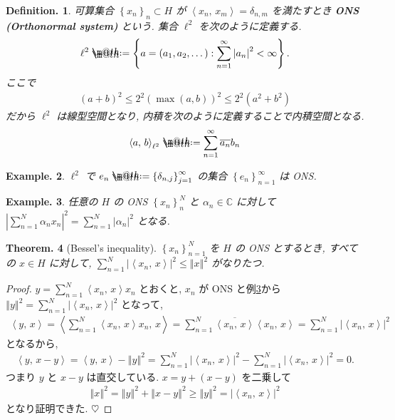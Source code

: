 \documentclass[openany, a4paper, oneside]{book}
\makeatletter
\newcommand*{\defeq}{\mathrel{\rlap{%
\raisebox{0.3ex}{$\m@th\cdot$}}%
\raisebox{-0.3ex}{$\m@th\cdot$}}%
=}
\theoremstyle{break}
\newtheorem{thm}{Theorem.}[section]
\theoremstyle{breakdefn}
\newtheorem{defn}[thm]{Definition.}
\newtheorem{ex}[thm]{Example.}
\newcommand{\abs}[1]{\left|#1\right|}
\newcommand{\norm}[1]{\left\Vert#1\right\Vert}
\newcommand{\rbk}[1]{\left (#1\right)}
\newcommand{\cbk}[1]{\left\{#1\right\}}
\newcommand{\bkt}[2]{\left\langle#1,\,#2\right\rangle}
\newcommand{\set}[2]{\left\{#1 : #2\right\}}
\newcommand{\bbC}{\mathbb{C}}
\newcommand{\upbf}[1]{\textup{\textbf{#1}}}
\makeatother
\begin{document}
\begin{defn}
 可算集合 $\cbk{x_n}_{n} \subset H$ が $\bkt{x_n}{x_m} = \delta_{n,m} $ を満たすとき \upbf{ONS (Orthonormal system)} という.
 集合 $\ell^2$ を次のように定義する.
 \begin{align}
  \ell^2
  \defeq
  \set{a = \rbk{a_1, a_2, \dots}}{\sum_{n=1}^{\infty} \abs{a_n}^2 < \infty}.
 \end{align}
 ここで
 \begin{align}
  (a+b)^2
  \leq
  2^2 \rbk{\max (a,b)}^2
  \leq
  2^2 (a^2 + b^2)
 \end{align}
 だから $\ell^2$ は線型空間となり,
 内積を次のように定義することで内積空間となる.
 \begin{align}
  \bkt{a}{b}_{\ell^2}
  \defeq
  \sum_{n = 1}^\infty \overline{a_{n}}b_{n}
 \end{align}
\end{defn}
\begin{ex}
 $\ell^2$ で $e_{n} \defeq \cbk{\delta_{n,j}}_{j = 1}^\infty$ の集合 $\cbk{e_{n}}_{n=1}^\infty$ は ONS.
\end{ex}
\begin{ex}\label{functional_analysis_hilbert_space_yukimi_ons}
 任意の $H$ の ONS $\cbk{x_{n}}_{n}^N$ と $\alpha_{n} \in \bbC$ に対して
 $\abs{\sum_{n = 1}^N \alpha_{n} x_{n}}^2 = \sum_{n = 1}^N \abs{\alpha_{n}}^2$ となる.
\end{ex}

\begin{thm}[Bessel's inequality]\label{functional_analysis_hilbert_space_yukimi_Bessel}
 $\cbk{x_{n}}_{n = 1}^N$ を $H$ の ONS とするとき,
 すべての $x \in H$ に対して, $\sum_{n=1}^N \abs{\bkt{x_n}{x}}^2 \leq \norm{x}^2$ がなりたつ.
\end{thm}
\begin{proof}
$y = \sum_{n=1}^N \bkt{x_n}{x} x_{n}$ とおくと,
$x_{n}$ が ONS と例\ref{functional_analysis_hilbert_space_yukimi_ons}から
$\norm{y}^2 = \sum_{n=1}^N \abs{\bkt{x_n}{x}}^2$ となって,
\begin{align}
 \bkt{y}{x}
 =
 \bkt{\sum_{n=1}^N \bkt{x_n}{x} x_n}{x}
 =
 \sum_{n=1}^N \overline{\bkt{x_n}{x}} \bkt{x_n}{x}
 =
 \sum_{n=1}^N \abs{\bkt{x_n}{x}}^2
\end{align}
となるから,
\begin{align}
 \bkt{y}{x - y}
 =
 \bkt{y}{x} - \norm{y}^2
 =
 \sum_{n=1}^N \abs{\bkt{x_n}{x}}^2 - \sum_{n=1}^N \abs{\bkt{x_n}{x}}^2
 = 0.
\end{align}
つまり $y$ と $x-y$ は直交している.
$x = y + (x-y)$ を二乗して
\begin{align}
 \norm{x}^2
 =
 \norm{y}^2 + \norm{x - y}^2
 \geq
 \norm{y}^2
 =
 \abs{\bkt{x_n}{x}}^2
\end{align}
となり証明できた.
$\heartsuit$
\end{proof}
\end{document}

